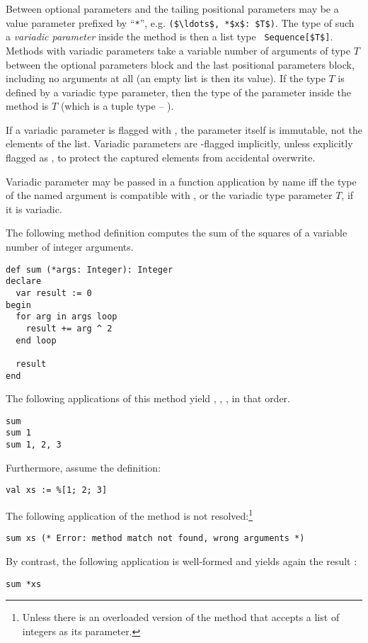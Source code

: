 Between optional parameters and the tailing positional parameters may be a value parameter prefixed by ``\lstinline!*!'', e.g. \lstinline!($\ldots$, *$x$: $T$)!. The type of such a {\em variadic parameter} inside the method is then a list type ~\lstinline!Sequence[$T$]!. Methods with variadic parameters take a variable number of arguments of type $T$ between the optional parameters block and the last positional parameters block, including no arguments at all (an empty list is then its value). If the type $T$ is defined by a variadic type parameter, then the type of the parameter inside the method is $T$ (which is a tuple type -- ). 

If a variadic parameter is flagged with , the parameter itself is immutable, not the elements of the list. Variadic parameters are -flagged implicitly, unless explicitly flagged as , to protect the captured elements from accidental overwrite. 

Variadic parameter may be passed in a function application by name iff the type of the named argument is compatible with , or the variadic type parameter $T$, if it is variadic. 

\example The following method definition computes the sum of the squares of a variable number of integer arguments.
\begin{lstlisting}
def sum (*args: Integer): Integer
declare
  var result := 0
begin
  for arg in args loop
    result += arg ^ 2
  end loop
  
  result
end
\end{lstlisting}
The following applications of this method yield , , , in that order.
\begin{lstlisting}
sum
sum 1
sum 1, 2, 3
\end{lstlisting}
Furthermore, assume the definition:
\begin{lstlisting}
val xs := %[1; 2; 3]
\end{lstlisting}
The following application of the method  is not resolved:\footnote{Unless there is an overloaded version of the method that accepts a list of integers as its parameter.}
\begin{lstlisting}
sum xs (* Error: method match not found, wrong arguments *)
\end{lstlisting}
By contrast, the following application is well-formed and yields again the result :
\begin{lstlisting}
sum *xs
\end{lstlisting}






